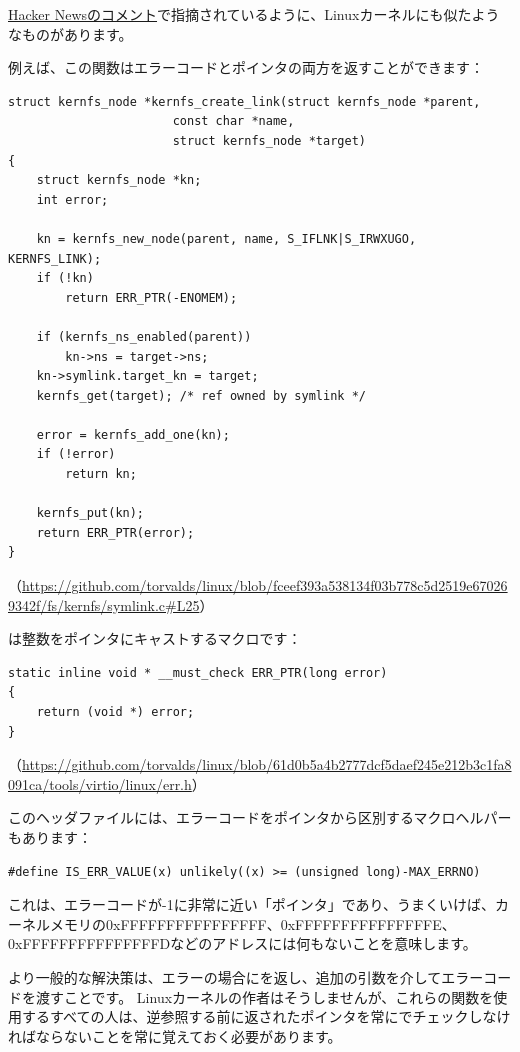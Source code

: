 \href{https://news.ycombinator.com/item?id=11823647}{Hacker Newsのコメント}で指摘されているように、Linuxカーネルにも似たようなものがあります。

例えば、この関数はエラーコードとポインタの両方を返すことができます：

\begin{lstlisting}[style=customc]
struct kernfs_node *kernfs_create_link(struct kernfs_node *parent,
				       const char *name,
				       struct kernfs_node *target)
{
	struct kernfs_node *kn;
	int error;

	kn = kernfs_new_node(parent, name, S_IFLNK|S_IRWXUGO, KERNFS_LINK);
	if (!kn)
		return ERR_PTR(-ENOMEM);

	if (kernfs_ns_enabled(parent))
		kn->ns = target->ns;
	kn->symlink.target_kn = target;
	kernfs_get(target);	/* ref owned by symlink */

	error = kernfs_add_one(kn);
	if (!error)
		return kn;

	kernfs_put(kn);
	return ERR_PTR(error);
}
\end{lstlisting}

（\url{https://github.com/torvalds/linux/blob/fceef393a538134f03b778c5d2519e670269342f/fs/kernfs/symlink.c#L25}）

は整数をポインタにキャストするマクロです：

\begin{lstlisting}[style=customc]
static inline void * __must_check ERR_PTR(long error)
{
	return (void *) error;
}
\end{lstlisting}

（\url{https://github.com/torvalds/linux/blob/61d0b5a4b2777dcf5daef245e212b3c1fa8091ca/tools/virtio/linux/err.h}）

このヘッダファイルには、エラーコードをポインタから区別するマクロヘルパーもあります：

\begin{lstlisting}[style=customc]
#define IS_ERR_VALUE(x) unlikely((x) >= (unsigned long)-MAX_ERRNO)
\end{lstlisting}

これは、エラーコードが-1に非常に近い「ポインタ」であり、うまくいけば、カーネルメモリの0xFFFFFFFFFFFFFFFF、0xFFFFFFFFFFFFFFFE、0xFFFFFFFFFFFFFFFDなどのアドレスには何もないことを意味します。

より一般的な解決策は、エラーの場合にを返し、追加の引数を介してエラーコードを渡すことです。
Linuxカーネルの作者はそうしませんが、これらの関数を使用するすべての人は、逆参照する前に返されたポインタを常にでチェックしなければならないことを常に覚えておく必要があります。

